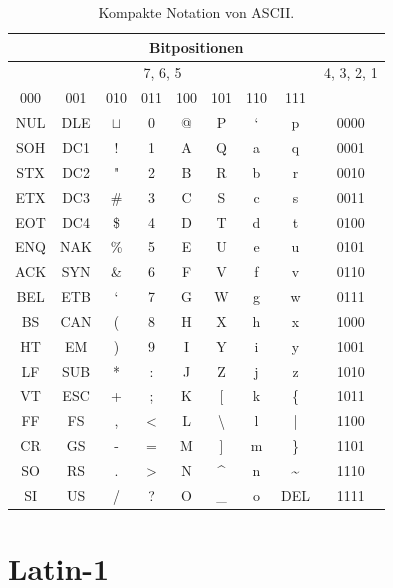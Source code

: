 \begin{table}[htb]
\centering
\begin{tabular}{|c|c|c|c|c|c|c|c||c|}
\hline
\multicolumn{9}{|c|}{Bitpositionen} \\ \hline
\multicolumn{8}{|c||}{7, 6, 5} & 4, 3, 2, 1 \\ \hline \hline
000 & 001 & 010 & 011 & 100 & 101 & 110 & 111 & \\\hline 
NUL & DLE & $\sqcup$  & 0   & @   & P   &  `   &  p & 0000    \\ \hline 
SOH  & DC1   &  !   &  1   &  A   &  Q   &  a   &  q & 0001     \\ \hline 
STX   &  DC2    &   "   &   2  &  B   &  R   &  b   &  r & 0010     \\ \hline 
ETX   &  DC3    &  \#   &  3   &  C   &  S   &  c   &  s & 0011     \\ \hline 
EOT   & DC4    &  \$   &  4   &  D   &  T   &  d   &  t & 0100     \\ \hline 
ENQ  & NAK    &  \%   &  5   &  E   &  U   & e    & u & 0101      \\ \hline 
ACK  & SYN    & \&    &  6   &  F   &  V   &  f   &  v & 0110    \\ \hline 
BEL   & ETB   & ‘     &   7 &  G   &  W   &  g   &  w & 0111    \\ \hline 
BS   &  CAN   &  (    &  8   & H    & X    &  h   &  x & 1000    \\ \hline 
HT   &  EM   &  )   &  9   &  I   &  Y   &  i   &  y & 1001     \\ \hline 
LF   &  SUB   &  *   & :    &  J   &  Z   & j    & z & 1010     \\ \hline 
VT   &   ESC  &  +   & ;    &  K   &  [   & k    & \{ & 1011      \\ \hline 
FF   & FS    &  ,   & <    &  L   &  \textbackslash   &  l   &  | & 1100    \\ \hline 
CR   &  GS   &  -   & =    & M    &  ]   & m    &  \}  & 1101   \\ \hline 
SO   &  RS   &  .   &  >   &  N   &  \textasciicircum   &  n   &  \textasciitilde  & 1110   \\ \hline 
SI  &  US   &   /  &  ?   &  O   &  \_   & o    & DEL & 1111    \\ \hline
\end{tabular}
\caption{Kompakte Notation von \ac{ASCII}.}
\label{table-ascii-compact}
\end{table}

\section{Latin-1}


